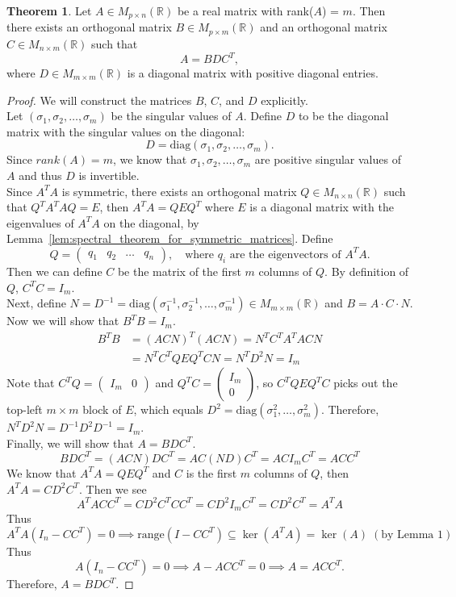 \documentclass[letterpaper, 11pt]{article}
\newcommand{\R}{\mathbb{R}}   %
\newcommand{\1}{\mathds{1}}		%
\theoremstyle{definition}
\newtheorem{theorem}{Theorem}[section]
\begin{document}
\begin{theorem}
  Let $A \in M_{p \times n}(\R)$ be a real matrix with rank($A$) = $m$. Then there exists an orthogonal matrix $B \in M_{p \times m}(\R)$ and an orthogonal matrix $C \in M_{n \times m}(\R)$ such that 
  \[
    A = B D C^T,
  \]
  where $D \in M_{m \times m}(\R)$ is a diagonal matrix with positive diagonal entries.
\end{theorem}
\begin{proof}
  We will construct the matrices $B$, $C$, and $D$ explicitly.\\
  Let $(\sigma_1, \sigma_2, \ldots, \sigma_m)$ be the singular values of $A$.
  Define $D$ to be the diagonal matrix with the singular values on the diagonal:
  \[
    D = \text{diag}(\sigma_1, \sigma_2, \ldots, \sigma_m).
  \]
  Since $rank(A) = m$, we know that $\sigma_1, \sigma_2, \ldots, \sigma_m$ are positive singular values of $A$ and thus $D$ is invertible.\\
  Since $A^TA$ is symmetric, there exists an orthogonal matrix $Q \in M_{n \times n}(\R)$ such that $Q^T A^T A Q = E$, then $A^TA = Q E Q^T$ where $E$ is a diagonal matrix with the eigenvalues of $A^TA$ on the diagonal, by Lemma~\ref{lem:spectral_theorem_for_symmetric_matrices}. Define
  \[
    Q = \begin{pmatrix} q_1 & q_2 & \ldots & q_n \end{pmatrix}, \quad \text{where } q_i \text{ are the eigenvectors of } A^TA.
  \]
  Then we can define $C$ be the matrix of the first $m$ columns of $Q$. By definition of $Q$, $C^T C = I_m$.\\
  Next, define $N = D^{-1} = \text{diag}(\sigma_1^{-1}, \sigma_2^{-1}, \ldots, \sigma_m^{-1}) \in M_{m \times m}(\R)$ and $B = A \cdot C \cdot N$.\\
  Now we will show that $B^T B = I_m$.\\
  \begin{align*}
    B^TB &= (A C N)^T (A C N) = N^T C^T A^T A C N \\
         &= N^T C^T Q E Q^T C N = N^T D^2 N = I_m
  \end{align*}
  Note that $C^T Q = \begin{pmatrix} I_m & 0 \end{pmatrix}$ and $Q^T C = \begin{pmatrix} I_m \\ 0 \end{pmatrix}$, so $C^T Q E Q^T C$ picks out the top-left $m \times m$ block of $E$, which equals $D^2 = \text{diag}(\sigma_1^2, \ldots, \sigma_m^2)$. Therefore, $N^T D^2 N = D^{-1} D^2 D^{-1} = I_m$.\\
  Finally, we will show that $A = B D C^T$.
  \[
    B D C^T = (A C N) D C^T = A C (N D) C^T = A C I_m C^T = A C C^T
  \]
  We know that $A^T A = Q E Q^T$ and $C$ is the first $m$ columns of $Q$, then $A^T A = C D^2 C^T$. Then we see
  \[
    A^T A C C^T = C D^2 C^T C C^T = C D^2 I_m C^T = C D^2 C^T = A^T A
  \]
  Thus
  \[
    A^T A (I_n - C C^T) = 0 \implies \text{range}(I - C C^T) \subseteq \ker(A^T A) = \ker(A) \; (\text{by Lemma 1})
  \]
  Thus
  \[
    A (I_n - C C^T) = 0 \implies A - ACC^T = 0 \implies A = ACC^T.
  \]
  Therefore, $A = B D C^T$.
\end{proof}
\end{document}
